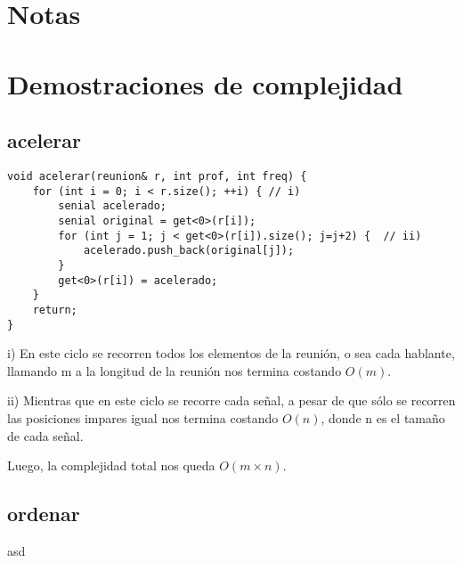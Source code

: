 \documentclass{article}
\begin{document}
\maketitle

\tableofcontents
\newpage



\section*{Notas}
\vspace{0.5cm}


\newpage
{}
\section*{Demostraciones de complejidad}
\vspace{0.5cm}
\subsection{acelerar}
\begin{lstlisting}
void acelerar(reunion& r, int prof, int freq) {
    for (int i = 0; i < r.size(); ++i) { // i)
        senial acelerado;
        senial original = get<0>(r[i]);
        for (int j = 1; j < get<0>(r[i]).size(); j=j+2) {  // ii)
            acelerado.push_back(original[j]);
        }
        get<0>(r[i]) = acelerado;
    }
    return; 
}
\end{lstlisting}
i) En este ciclo se recorren todos los elementos de la reunión, o sea cada hablante, llamando m a la longitud de la reunión nos termina costando $O(m)$.

ii) Mientras que en este ciclo se recorre cada señal, a pesar de que sólo se recorren las posiciones impares igual nos termina costando $O(n)$, donde n es el tamaño de cada señal.

Luego, la complejidad total nos queda $O(m \times n)$.

\subsection{ordenar}
asd
\end{document}
